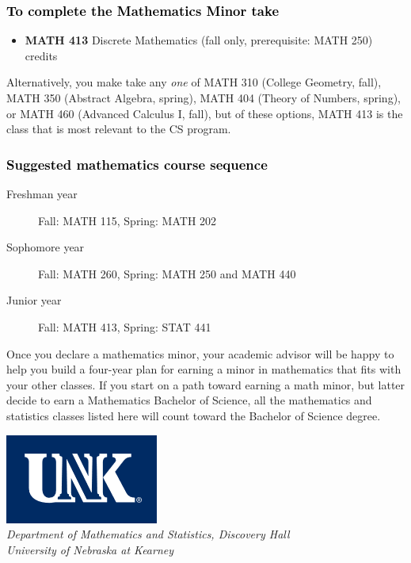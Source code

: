 \documentclass[10pt]{article}
\newenvironment{mypar}[2]
   {\begin{list}{}%
     {\setlength\leftmargin{#1}
     \setlength\rightmargin{#2}}
     \item[]}
   {\end{list}}
\newcommand{\discrete}{\textbf{MATH 413} Discrete Mathematics  (fall only, prerequisite: MATH 250)\dotfill 3 credits}
\begin{document}
\subsubsection*{\textcolor{black}{To complete the Mathematics Minor  take}}

\begin{itemize}
\item \discrete
\end{itemize}
\begin{mypar}{0.5cm}{0.5cm}
Alternatively, you make take any \emph{one} of MATH 310 (College Geometry, fall),  MATH 350 (Abstract Algebra, spring),  MATH 404  (Theory of Numbers, spring), or
MATH 460 (Advanced Calculus I, fall), but of these options, MATH 413 is  the class that is most relevant to the CS program.  \end{mypar}

\vspace{-0.1in}
\subsubsection*{\textcolor{black}{Suggested mathematics course sequence}}

\begin{description}
   \item[\phantom{xxx} Freshman year] Fall: MATH 115, Spring:  MATH 202
      \item[\phantom{xxx} Sophomore year]  Fall: MATH 260,  Spring: MATH 250  and MATH 440
     \item[\phantom{xxx} Junior year]  Fall: MATH 413,  Spring: STAT 441
 \end{description}
Once you declare a mathematics minor, your academic advisor will be happy to help you build a four-year plan for earning a minor in mathematics that fits with your other classes.  If you start on a path toward earning a math minor, but latter decide to earn a  Mathematics Bachelor of Science, all the mathematics and statistics  classes listed here will count toward the Bachelor of Science degree.




\newpage

\begin{flushleft}
\includegraphics[scale=0.25]{unk-logo}\\
 \emph{\textcolor{unkblue}{Department of Mathematics and Statistics, Discovery Hall}} \\
  \emph{\textcolor{unkblue}{University of Nebraska at Kearney}}
\end{flushleft}
\end{document}

